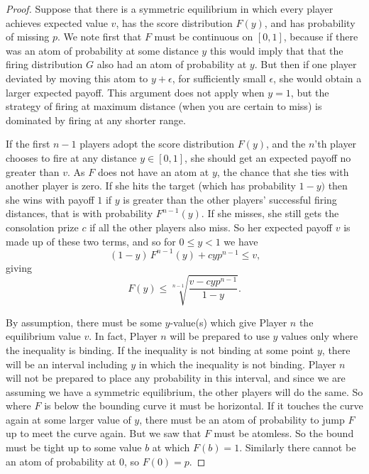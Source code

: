 \documentclass[11pt,a4paper]{article}%
\numberwithin{equation}{section}
\theoremstyle{plain}
\begin{document}
\begin{proof}
Suppose that there is a symmetric equilibrium in which every player achieves expected value $v$, has the score distribution $F(y)$, and has probability of missing $p$. We note first that $F$ must be continuous on $[0, 1]$, because if there was an atom of probability at some distance $y$ this would imply that that the firing distribution $G$ also had an atom of probability at $y$. But then if one player deviated by moving this atom to $y + \epsilon$, for sufficiently small $\epsilon$, she would obtain a larger expected payoff. This argument does not apply when $y = 1$, but the strategy of firing at maximum distance (when you are certain to miss) is dominated by firing at any shorter range.
%
\par
If the first $n-1$ players adopt the score distribution $F(y)$, and the $n$'th player chooses to fire at any distance $y \in [0, 1]$, she should get an expected payoff no greater than $v$. As $F$ does not have an atom at $y$, the chance that she ties with another player is zero. If she hits the target (which has probability $1-y)$ then she wins with payoff $1$ if $y$ is greater than the other players' successful firing distances, that is with probability $F^{n-1}(y)$. If she misses, she still gets the consolation prize $c$ if all the other players also miss. So her expected payoff $v$ is made up of these two terms, and so for $0 \leqslant y < 1$ we have
%
\begin{equation}
\label{eq:cfirst}
(1 - y) \, F^{n-1}(y) + cyp^{n-1} \leqslant v
\text{,}
\end{equation}
giving
\begin{equation}
F(y) \leqslant \sqrt[n - 1]{\frac{v - cyp^{n-1}}{1 - y}}
\text{.}
\label{eq:csecond}
\end{equation}%
%
\par
By assumption, there must be some $y$-value(s) which give Player $n$ the equilibrium value $v$. In fact, Player $n$ will be prepared to use $y$ values only where the inequality is binding. If the inequality is not binding at some point $y$, there will be an interval including $y$ in which the inequality is not binding. Player $n$ will not be prepared to place any probability in this interval, and since we are assuming we have a symmetric equilibrium, the other players will do the same. So where $F$ is below the bounding curve it must be horizontal. If it touches the curve again at some larger value of $y$, there must be an atom of probability to jump $F$ up to meet the curve again. But we saw that $F$ must be atomless. So the bound must be tight up to some value $b$ at which $F(b) = 1$. Similarly there cannot be an atom of probability at $0$, so $F(0) = p$.

\end{proof}
\end{document}
